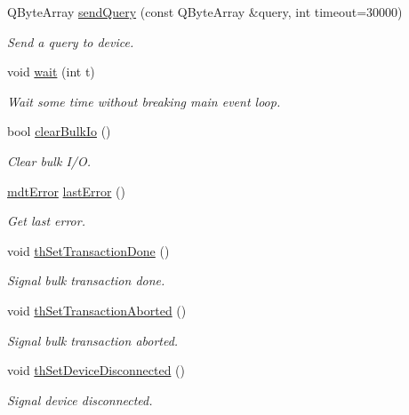 \begin{DoxyCompactItemize}
Q\-Byte\-Array \hyperlink{classmdt_usbtmc_port_a0c250cc416a01d2dd704b629b163d3a6}{send\-Query} (const Q\-Byte\-Array \&query, int timeout=30000)
\begin{DoxyCompactList}\small\item\em Send a query to device. \end{DoxyCompactList}\item 
void \hyperlink{classmdt_usbtmc_port_ae30c4eb212e9859a834c53df052e1da9}{wait} (int t)
\begin{DoxyCompactList}\small\item\em Wait some time without breaking main event loop. \end{DoxyCompactList}\item 
bool \hyperlink{classmdt_usbtmc_port_afbf76bc83c54937dfb0e88ad6f517dc5}{clear\-Bulk\-Io} ()
\begin{DoxyCompactList}\small\item\em Clear bulk I/\-O. \end{DoxyCompactList}\item 
\hyperlink{classmdt_error}{mdt\-Error} \hyperlink{classmdt_usbtmc_port_ad08e3ff4682797e8604400026418bdc8}{last\-Error} ()
\begin{DoxyCompactList}\small\item\em Get last error. \end{DoxyCompactList}\item 
void \hyperlink{classmdt_usbtmc_port_ab72af815af2f766e4062e2db43998f7c}{th\-Set\-Transaction\-Done} ()
\begin{DoxyCompactList}\small\item\em Signal bulk transaction done. \end{DoxyCompactList}\item 
void \hyperlink{classmdt_usbtmc_port_a1f864b8480f5953c0166478dd0f0c2c2}{th\-Set\-Transaction\-Aborted} ()
\begin{DoxyCompactList}\small\item\em Signal bulk transaction aborted. \end{DoxyCompactList}\item 
void \hyperlink{classmdt_usbtmc_port_a476cae8e5b124980ea2925e98fa70c68}{th\-Set\-Device\-Disconnected} ()
\begin{DoxyCompactList}\small\item\em Signal device disconnected. \end{DoxyCompactList}\end{DoxyCompactItemize}


